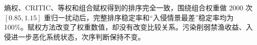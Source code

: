 熵权、CRITIC、等权和组合赋权得到的排序完全一致，围绕组合权重做 2000 次 $[0.85,1.15]$ 重归一扰动后，完整排序稳定率和“入侵情景最差”稳定率均为 100\%。赋权方法改变了权重数值，却没有改变比较关系。污染削弱禁渔收益、入侵进一步恶化系统状态，次序判断保持不变。
